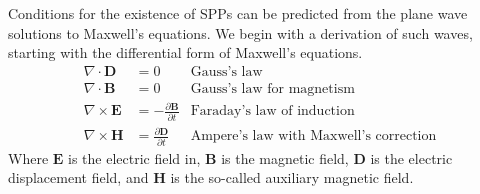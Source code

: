 Conditions for the existence of SPPs can be predicted from the plane wave
solutions to Maxwell's equations.  We begin with a derivation of such
waves, starting with the differential form of Maxwell's equations.
\begin{align}
\nabla \cdot \mathbf{D} &= 0 & \text{Gauss's law} \label{eqn:gausslaw}\\
\nabla \cdot \mathbf{B} &= 0 & \text{Gauss's law for magnetism} \label{eqn:gausslawmagnetism}\\
\nabla \times \mathbf{E} &= -\frac{\partial \mathbf{B}} {\partial t}
& \text{Faraday's law of induction} \label{eqn:faradayslaw} \\
\nabla \times \mathbf{H} &= \frac{\partial \mathbf{D}} {\partial
t}  & \text{Ampere's law with Maxwell's correction}
\label{eqn:ampereslaw}
\end{align}
Where $\mathbf{E}$ is the electric field in,
$\mathbf{B}$ is the magnetic field, $\mathbf{D}$ is the electric
displacement field, and $\mathbf{H}$ is
the so-called auxiliary magnetic field.

